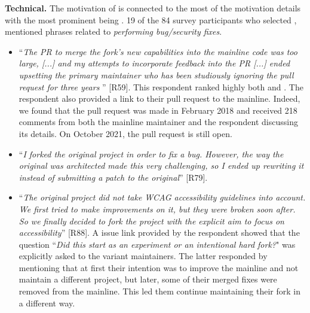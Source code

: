 \nd \textbf{Technical.} The motivation of  is connected to the most of the motivation details with the most prominent being . 19 of the 84 survey participants who selected , mentioned phrases related to \emph{performing bug/security fixes}.

\begin{itemize}[leftmargin=*]


\item ``\emph{The PR to merge the fork's new capabilities into the mainline code was too large, [...] %
and my attempts to incorporate feedback into the PR [...] %
ended upsetting the primary maintainer who has been studiously ignoring the pull request for three years \frownie{}}'' [R59].
This respondent ranked highly both  and . The respondent also provided a \gh link to their pull request to the mainline. Indeed, we found that the pull request was made in February 2018 and received 218 comments from both the mainline maintainer and the respondent discussing its details. On October 2021, the pull request is still open.

\item ``\emph{I forked the original project in order to fix a bug. However, the way the original was architected made this very challenging, so I ended up rewriting it instead of submitting a patch to the original}'' [R79].

\item ``\emph{The original project did not take WCAG accessibility guidelines into account. We first tried to make improvements on it, but they were broken soon after. So we finally decided to fork the project with the explicit aim to focus on accessibility}'' [R88]. A \gh issue link provided by the respondent showed that the question ``\textit{Did this start as an experiment or an intentional hard fork?}" was explicitly asked to the variant maintainers. The latter responded by mentioning that at first their intention was to improve the mainline and not maintain a different project, but later, some of their merged fixes were removed from the mainline. This led them continue maintaining their fork in a different way.

\end{itemize}

